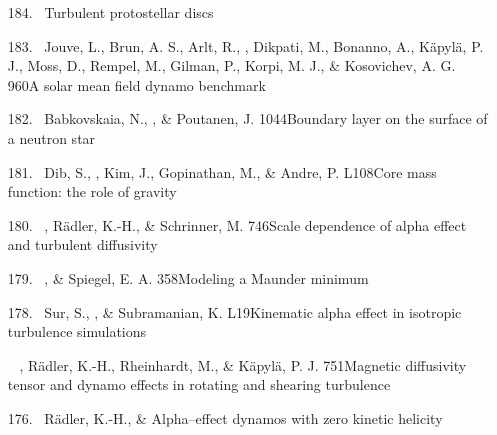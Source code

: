 \begin{itemize}
\item[{184.}~]
\Brandenburg{}
{Turbulent protostellar discs}

\item[{183.}~]
Jouve, L., Brun, A. S., Arlt, R., \Brandenburg, Dikpati, M.,
Bonanno, A., K\"apyl\"a, P. J., Moss, D., Rempel, M., Gilman, P.,
Korpi, M. J., \& Kosovichev, A. G.
{960}{A solar mean field dynamo benchmark}

\item[{182.}~]
Babkovskaia, N., \Brandenburg, \& Poutanen, J.
{1044}{Boundary layer on the surface of a neutron star}

\item[{181.}~]
Dib, S., \Brandenburg, Kim, J., Gopinathan, M.,
\& Andre, P.
{L108}{Core mass function: the role of gravity}

\item[{180.}~]
\Brandenburg, R\"adler, K.-H., \& Schrinner, M.
{746}{Scale dependence of alpha effect and turbulent diffusivity}

\item[{179.}~]
\Brandenburg, \& Spiegel, E. A.
{358}{Modeling a Maunder minimum}

\item[{178.}~]
Sur, S., \Brandenburg, \& Subramanian, K.
{L19}{Kinematic alpha effect in isotropic turbulence simulations}

\item[\important \relevant {177.}~]
\Brandenburg, R\"adler, K.-H., Rheinhardt, M., \& K\"apyl\"a, P. J.
{751}{Magnetic diffusivity tensor and dynamo effects in rotating
and shearing turbulence}

\item[{176.}~]
R\"adler, K.-H., \& \Brandenburg{}
{Alpha--effect dynamos with zero kinetic helicity}


\end{itemize}
